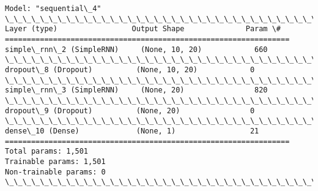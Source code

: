 \documentclass[11pt]{article}
\begin{document}
    \begin{Verbatim}[commandchars=\\\{\}]
Model: "sequential\_4"
\_\_\_\_\_\_\_\_\_\_\_\_\_\_\_\_\_\_\_\_\_\_\_\_\_\_\_\_\_\_\_\_\_\_\_\_\_\_\_\_\_\_\_\_\_\_\_\_\_\_\_\_\_\_\_\_\_\_\_\_\_\_\_\_\_
Layer (type)                 Output Shape              Param \#
=================================================================
simple\_rnn\_2 (SimpleRNN)     (None, 10, 20)            660
\_\_\_\_\_\_\_\_\_\_\_\_\_\_\_\_\_\_\_\_\_\_\_\_\_\_\_\_\_\_\_\_\_\_\_\_\_\_\_\_\_\_\_\_\_\_\_\_\_\_\_\_\_\_\_\_\_\_\_\_\_\_\_\_\_
dropout\_8 (Dropout)          (None, 10, 20)            0
\_\_\_\_\_\_\_\_\_\_\_\_\_\_\_\_\_\_\_\_\_\_\_\_\_\_\_\_\_\_\_\_\_\_\_\_\_\_\_\_\_\_\_\_\_\_\_\_\_\_\_\_\_\_\_\_\_\_\_\_\_\_\_\_\_
simple\_rnn\_3 (SimpleRNN)     (None, 20)                820
\_\_\_\_\_\_\_\_\_\_\_\_\_\_\_\_\_\_\_\_\_\_\_\_\_\_\_\_\_\_\_\_\_\_\_\_\_\_\_\_\_\_\_\_\_\_\_\_\_\_\_\_\_\_\_\_\_\_\_\_\_\_\_\_\_
dropout\_9 (Dropout)          (None, 20)                0
\_\_\_\_\_\_\_\_\_\_\_\_\_\_\_\_\_\_\_\_\_\_\_\_\_\_\_\_\_\_\_\_\_\_\_\_\_\_\_\_\_\_\_\_\_\_\_\_\_\_\_\_\_\_\_\_\_\_\_\_\_\_\_\_\_
dense\_10 (Dense)             (None, 1)                 21
=================================================================
Total params: 1,501
Trainable params: 1,501
Non-trainable params: 0
\_\_\_\_\_\_\_\_\_\_\_\_\_\_\_\_\_\_\_\_\_\_\_\_\_\_\_\_\_\_\_\_\_\_\_\_\_\_\_\_\_\_\_\_\_\_\_\_\_\_\_\_\_\_\_\_\_\_\_\_\_\_\_\_\_
    \end{Verbatim}
\end{document}
